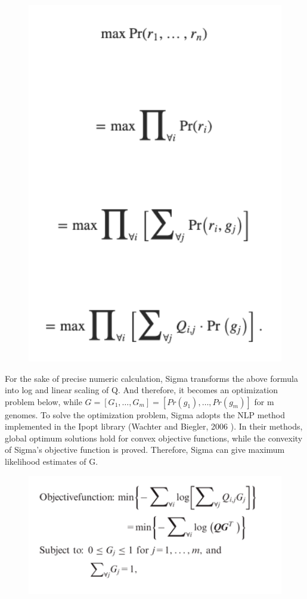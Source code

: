 \begin{figure}
    \centering
    \includegraphics[width=12cm]{Images/sigma6}
    \label{fig:sigma6.png}
\end{figure}
For the sake of precise numeric calculation, Sigma transforms the above formula into log and linear scaling of Q. And therefore, it becomes an optimization problem below, while $G=[G_1,…,G_m]=[Pr(g_1),…,Pr(g_m)]$ for m genomes. To solve the optimization problem, Sigma adopts the NLP method implemented in the Ipopt library (Wachter and Biegler, 2006 ). In their methods, global optimum solutions hold for convex objective functions, while the convexity of Sigma’s objective function is proved. Therefore, Sigma can give maximum likelihood estimates of G. 
\begin{figure}
    \centering
    \includegraphics[width=12cm]{Images/sigma7}
    \label{fig:sigma7.png}
\end{figure}
